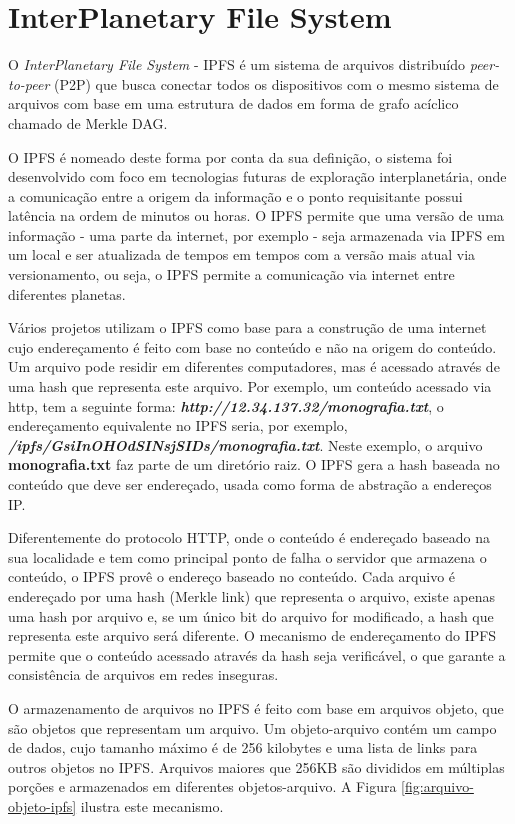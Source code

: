 \documentclass[tcc,capa]{texufpel}
\begin{document}
\section{InterPlanetary File System}

    O \textit{InterPlanetary File System} - IPFS é um sistema de arquivos distribuído \textit{peer-to-peer} (P2P) que busca conectar todos os dispositivos com o mesmo sistema de arquivos com base em uma estrutura de dados em forma de grafo acíclico chamado de Merkle DAG.
    
    O IPFS é nomeado deste forma por conta da sua definição, o sistema foi desenvolvido com foco em tecnologias futuras de exploração interplanetária, onde a comunicação entre a origem da informação e o ponto requisitante possui latência na ordem de minutos ou horas. O IPFS permite que uma versão de uma informação - uma parte da internet, por exemplo - seja armazenada via IPFS em um local e ser atualizada de tempos em tempos com a versão mais atual via versionamento, ou seja, o IPFS permite a comunicação via internet entre diferentes planetas.
    
    Vários projetos utilizam o IPFS como base para a construção de uma internet cujo endereçamento é feito com base no conteúdo e não na origem do conteúdo. Um arquivo pode residir em diferentes computadores, mas é acessado através de uma hash que representa este arquivo. Por exemplo, um conteúdo acessado via http, tem a seguinte forma: \textbf{\textit{http://12.34.137.32/monografia.txt}}, o endereçamento equivalente no IPFS seria, por exemplo, \textbf{\textit{/ipfs/GsiInOHOdSINsjSIDs/monografia.txt}}. Neste exemplo, o arquivo \textbf{monografia.txt} faz parte de um diretório raiz. O IPFS gera a hash baseada no conteúdo que deve ser endereçado, usada como forma de abstração a endereços IP.
    
    Diferentemente do protocolo HTTP, onde o conteúdo é endereçado baseado na sua localidade e tem como principal ponto de falha o servidor que armazena o conteúdo, o IPFS provê o endereço baseado no conteúdo. Cada arquivo é endereçado por uma hash (Merkle link) que representa o arquivo, existe apenas uma hash por arquivo e, se um único bit do arquivo for modificado, a hash que representa este arquivo será diferente. O mecanismo de endereçamento do IPFS permite que o conteúdo acessado através da hash seja verificável, o que garante a consistência de arquivos em redes inseguras.
    
    O armazenamento de arquivos no IPFS é feito com base em arquivos objeto, que são objetos que representam um arquivo. Um objeto-arquivo contém um campo de dados, cujo tamanho máximo é de 256 kilobytes e uma lista de links para outros objetos no IPFS. Arquivos maiores que 256KB são divididos em múltiplas porções e armazenados em diferentes objetos-arquivo. A Figura \ref{fig:arquivo-objeto-ipfs} ilustra este mecanismo.
    
\end{document}
